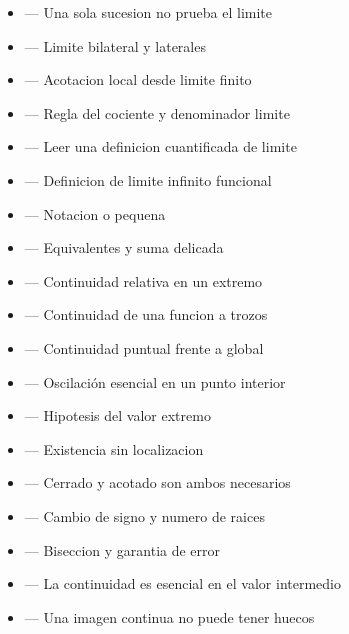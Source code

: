 \documentclass[10pt,a4paper,oneside,openany]{book}
\begin{document}
\begin{itemize}
\item {} — Una sola sucesion no prueba el limite
\item {} — Limite bilateral y laterales
\item {} — Acotacion local desde limite finito
\item {} — Regla del cociente y denominador limite
\item {} — Leer una definicion cuantificada de limite
\item {} — Definicion de limite infinito funcional
\item {} — Notacion o pequena
\item {} — Equivalentes y suma delicada
\item {} — Continuidad relativa en un extremo
\item {} — Continuidad de una funcion a trozos
\item {} — Continuidad puntual frente a global
\item {} — Oscilación esencial en un punto interior
\item {} — Hipotesis del valor extremo
\item {} — Existencia sin localizacion
\item {} — Cerrado y acotado son ambos necesarios
\item {} — Cambio de signo y numero de raices
\item {} — Biseccion y garantia de error
\item {} — La continuidad es esencial en el valor intermedio
\item {} — Una imagen continua no puede tener huecos
\end{itemize}
\end{document}
